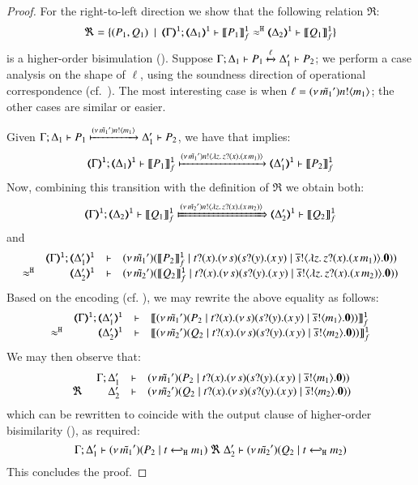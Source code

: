 \begin{proof}
	\noi For the right-to-left direction we show that the following relation $\Re$:
%
	\[
		\Re = \set{
		(P_1, Q_1) 
		\setbar \horel{\tmap{\Gamma}{1}}{\tmap{\Delta_1}{1}}{\pmapp{P_1}{1}{f}}{\hwb}{\tmap{\Delta_2}{1}}{\pmapp{Q_1}{1}{f}}}
	\]
	is a higher-order bisimulation ().
%
Suppose $\Gamma; \Delta_1 \vdash P_1 \xmapsto{\ell} \Delta_1' \vdash P_2$; 
we perform a case analysis on the shape of ${\ell}$, using 
the soundness direction of operational correspondence (cf.~).
		The  most interesting case is when $\ell = (\nu\, \tilde{m_1}') n ! \langle m_1 \rangle$; the other cases are similar or easier.

\bigskip

	\noi Given $\Gamma; \Delta_1 \vdash P_1 \xmapsto{(\nu\, \tilde{m_1}') n !\langle m_1 \rangle} \Delta_1' \vdash P_2$, 
	we have that  implies:
%
	\[
		\horel{\tmap{\Gamma}{1}}{\tmap{\Delta_1}{1}}{\pmapp{P_1}{1}{f}}{\hby{\news{\tilde{m_1}'} \bactout{n}{\abs{z}{\binp{z}{x} (\appl{x}{m_1})}}}}{\tmap{\Delta_1'}{1}}{\pmapp{P_2}{1}{f}}
	\]
%
	\noi Now, combining this transition with the definition of $\Re$ we obtain both:
%
$$
		\horel{\tmap{\Gamma}{1}}{\tmap{\Delta_2}{1}}{\pmapp{Q_1}{1}{f}}{\Hby{\news{\tilde{m_2}'} \bactout{n}{\abs{z}{\binp{z}{x} (\appl{x}{m_2})}}}}{\tmap{\Delta_2'}{1}}{\pmapp{Q_2}{1}{f}}
		\label{prop:HOp_to_HO:full_abs11}
$$
%
	\noi and
$$
		\mhorel	{\tmap{\Gamma}{1}}
			{\tmap{\Delta_1'}{1}}
			{\newsp{\tilde{m_1}'}{\pmapp{P_2}{1}{f}  \Par \hotrigger{t}{x}{s}{\abs{z}{\binp{z}{x} (\appl{x}{m_1})}} }}
			{\hwb}
			{\tmap{\Delta_2'}{1}}
			{}
			{\newsp{\tilde{m_2}'}{\pmapp{Q_2}{1}{f} \Par \hotrigger{t}{x}{s}{\abs{z}{\binp{z}{x} (\appl{x}{m_2})}}}}
$$
	\noi Based on the encoding  (cf. ), we may rewrite the above equality as follows:
	\[
		\mhorel{\tmap{\Gamma}{1}}{\tmap{\Delta_1'}{1}}{\pmapp{\newsp{\tilde{m_1}'}{P_2 
			\Par \hotrigger{t}{x}{s}{m_1}}}{1}{f}}
		{\hwb}{\tmap{\Delta_2'}{1}}{}{\pmapp{\newsp{\tilde{m_2}'}{Q_2 \Par \hotrigger{t}{x}{s}{m_2}}}{1}{f}}
	\]
%
	\noi We may then observe that:
$$
		\mhorel{\Gamma}{\Delta_1'}{\newsp{\tilde{m_1}'}{P_2 \Par \hotrigger{t}{x}{s}{m_1}}}
		{\ \Re\ }{\Delta_2'}{}{\newsp{\tilde{m_2}'}{Q_2 \Par \hotrigger{t}{x}{s}{m_2}}}
$$
	which can be rewritten to coincide with the output clause of higher-order bisimilarity (), as required:
$$
		\Gamma; \Delta_1' \vdash (\nu\, \tilde{m_1}')(P_2 \;|\; t \hookleftarrow_{\mathtt{H}} m_1) \ \Re\  \Delta_2' \vdash{(\nu\, \tilde{m_2}')(Q_2 \;|\;t \hookleftarrow_{\mathtt{H}} m_2)}
$$
This concludes the proof.
\bigskip


\end{proof}

